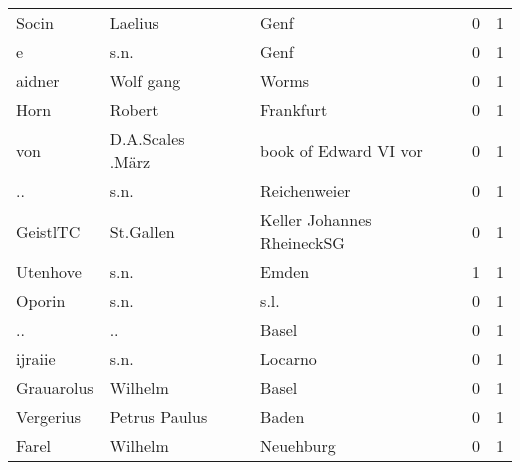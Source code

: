\documentclass[10pt,a4paper,landscape]{article}
\begin{document}
\begin{longtable}{llllrr}
                    Socin &                            Laelius &             &                                        Genf &          0 &         1 \\
                        e &                               s.n. &             &                                        Genf &          0 &         1 \\
                   aidner &                          Wolf gang &             &                                       Worms &          0 &         1 \\
                     Horn &                             Robert &             &                                   Frankfurt &          0 &         1 \\
                      von &                   D.A.Scales .März &             &                       book of Edward VI vor &          0 &         1 \\
                       .. &                               s.n. &             &                                Reichenweier &          0 &         1 \\
                 GeistlTC &                          St.Gallen &             &                  Keller Johannes RheineckSG &          0 &         1 \\
                 Utenhove &                               s.n. &             &                                       Emden &          1 &         1 \\
                   Oporin &                               s.n. &             &                                        s.l. &          0 &         1 \\
                       .. &                                 .. &             &                                       Basel &          0 &         1 \\
                  ijraiie &                               s.n. &             &                                     Locarno &          0 &         1 \\
               Grauarolus &                            Wilhelm &             &                                       Basel &          0 &         1 \\
                Vergerius &                      Petrus Paulus &             &                                       Baden &          0 &         1 \\
                    Farel &                            Wilhelm &             &                                   Neuehburg &          0 &         1 \\

\end{longtable}
\end{document}
